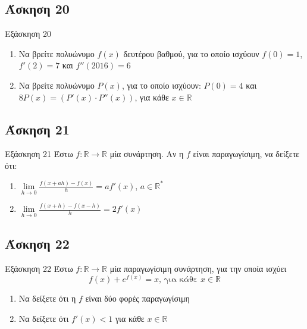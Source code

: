 \documentclass[greek]{beamer}
\begin{document}
\subsection{Άσκηση 20}
\begin{frame}[label=Άσκηση20]{Εξάσκηση 20}
  \begin{enumerate}
    \item<1->  Να βρείτε πολυώνυμο $f(x)$ δευτέρου βαθμού, για το οποίο ισχύουν $f(0)=1$, $f'(2)=7$ και $f''(2016)=6$
    \item<2-> Να βρείτε πολυώνυμο $P(x)$, για το οποίο ισχύουν: $P(0)=4$ και $8P(x)=\left( P'(x)\cdot P''(x) \right) $, για κάθε $x\in\mathbb{R}$
  \end{enumerate}

\end{frame}

\subsection{Άσκηση 21}
\begin{frame}[label=Άσκηση21]{Εξάσκηση 21}
  Έστω $f:\mathbb{R}\to\mathbb{R}$ μία συνάρτηση. Αν η $f$ είναι παραγωγίσιμη, να δείξετε ότι:
  \begin{enumerate}
    \item<1-> $\lim\limits_{h \to 0}{ \frac{f(x+ah)-f(x)}{h} }=af'(x)$, $a\in\mathbb{R}^*$
    \item<2-> $\lim\limits_{h \to 0}{ \frac{f(x+h)-f(x-h)}{h} }=2f'(x)$
  \end{enumerate}

\end{frame}

\subsection{Άσκηση 22}
\begin{frame}[label=Άσκηση22]{Εξάσκηση 22}
  Έστω $f:\mathbb{R}\to\mathbb{R}$ μία παραγωγίσιμη συνάρτηση, για την οποία ισχύει
  $$f(x)+e^{f(x)}=x \text{, για κάθε } x\in\mathbb{R}$$
  \begin{enumerate}
    \item<1-> Να δείξετε ότι η $f$ είναι δύο φορές παραγωγίσιμη
    \item<2-> Να δείξετε ότι $f'(x)<1$ για κάθε $x\in\mathbb{R}$
  \end{enumerate}

\end{frame}
\end{document}
